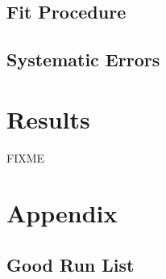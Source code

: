 \documentclass[12pt]{article}
\begin{document}
\subsection{Fit Procedure}
\label{sec:Fit}

\subsection{Systematic Errors}
\label{sec:SystErrors}



\section{Results}
{\color{red}FIXME}

\section{Appendix}

\subsection{Good Run List}
\end{document}

